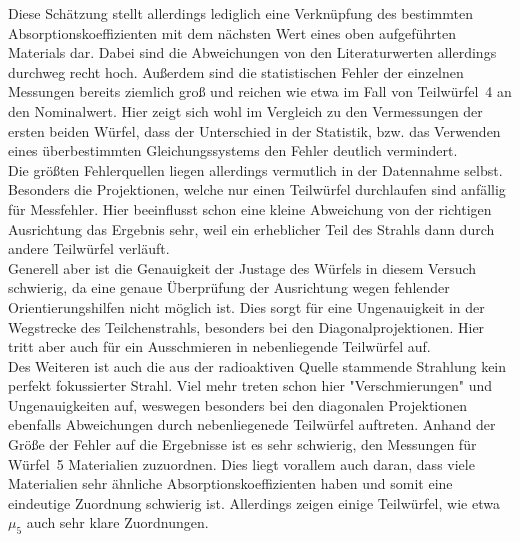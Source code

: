 Diese Schätzung stellt allerdings lediglich eine Verknüpfung des bestimmten 
Absorptionskoeffizienten mit dem nächsten Wert eines oben aufgeführten 
Materials dar.
Dabei sind die Abweichungen von den Literaturwerten allerdings durchweg recht 
hoch. Außerdem sind die statistischen Fehler der einzelnen Messungen bereits 
ziemlich groß und reichen wie etwa im Fall von Teilwürfel~4 an den Nominalwert.
Hier zeigt sich wohl im Vergleich zu den Vermessungen der ersten beiden Würfel, 
dass der Unterschied in der Statistik, bzw. das Verwenden eines überbestimmten 
Gleichungssystems den Fehler deutlich vermindert. \\
Die größten Fehlerquellen liegen allerdings vermutlich in der Datennahme selbst.
Besonders die Projektionen, welche nur einen Teilwürfel durchlaufen sind 
anfällig für Messfehler. Hier beeinflusst schon eine kleine Abweichung von der 
richtigen Ausrichtung das Ergebnis sehr, weil ein erheblicher Teil des Strahls 
dann durch andere Teilwürfel verläuft. \\
Generell aber ist die Genauigkeit der Justage des Würfels in diesem Versuch 
schwierig, da eine genaue Überprüfung der Ausrichtung wegen fehlender 
Orientierungshilfen nicht möglich ist. Dies sorgt für eine Ungenauigkeit in der 
Wegstrecke des Teilchenstrahls, besonders bei den Diagonalprojektionen. Hier 
tritt aber auch für ein Ausschmieren in nebenliegende Teilwürfel auf. \\
Des Weiteren ist auch die aus der radioaktiven Quelle stammende Strahlung kein 
perfekt fokussierter Strahl. Viel mehr treten schon hier "Verschmierungen" und 
Ungenauigkeiten auf, weswegen besonders bei den diagonalen Projektionen 
ebenfalls Abweichungen durch nebenliegenede Teilwürfel auftreten.
Anhand der Größe der Fehler auf die Ergebnisse ist es sehr schwierig, den 
Messungen für Würfel~5 Materialien zuzuordnen. Dies liegt vorallem auch daran, 
dass viele Materialien sehr ähnliche Absorptionskoeffizienten haben und somit 
eine eindeutige Zuordnung schwierig ist. Allerdings zeigen einige Teilwürfel, 
wie etwa $\mu_5$ auch sehr klare Zuordnungen.

